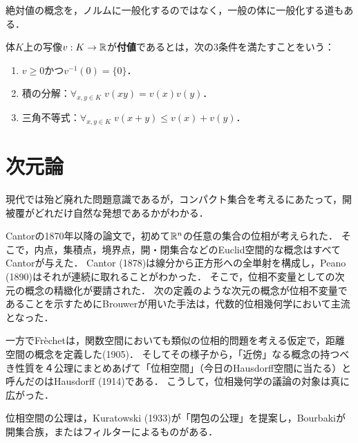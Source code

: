 \documentclass[uplatex,dvipdfmx]{jsreport}
\begin{document}
\begin{tcolorbox}[colframe=ForestGreen, colback=ForestGreen!10!white,breakable,colbacktitle=ForestGreen!40!white,coltitle=black,fonttitle=\bfseries\sffamily,
title=]
    絶対値の概念を，ノルムに一般化するのではなく，一般の体に一般化する道もある．
\end{tcolorbox}

\begin{definition}[valuation]
    体$K$上の写像$v:K\to\mathbb{R}$が\textbf{付値}であるとは，次の3条件を満たすことをいう：
    \begin{enumerate}
        \item $v\ge0$かつ$v^{-1}(0)=\{0\}$．
        \item 積の分解：$\forall_{x,y\in K}\;v(xy)=v(x)v(y)$．
        \item 三角不等式：$\forall_{x,y\in K}\;v(x+y)\le v(x)+v(y)$．
    \end{enumerate}
\end{definition}

\section{次元論}

\begin{tcolorbox}[colframe=ForestGreen, colback=ForestGreen!10!white,breakable,colbacktitle=ForestGreen!40!white,coltitle=black,fonttitle=\bfseries\sffamily,
title=]
    現代では殆ど廃れた問題意識であるが，コンパクト集合を考えるにあたって，開被覆がどれだけ自然な発想であるかがわかる．
\end{tcolorbox}

\begin{history}
    Cantorの1870年以降の論文で，初めて$\mathbb{R}^n$の任意の集合の位相が考えられた．
    そこで，内点，集積点，境界点，開・閉集合などのEuclid空間的な概念はすべてCantorが与えた．
    Cantor (1878)は線分から正方形への全単射を構成し，Peano (1890)はそれが連続に取れることがわかった．
    そこで，位相不変量としての次元の概念の精緻化が要請された．
    次の定義のような次元の概念が位相不変量であることを示すためにBrouwerが用いた手法は，代数的位相幾何学において主流となった．

    一方でFr\`{e}chetは，関数空間においても類似の位相的問題を考える仮定で，距離空間の概念を定義した(1905)．
    そしてその様子から，「近傍」なる概念の持つべき性質を４公理にまとめあげて「位相空間」（今日のHausdorff空間に当たる）と呼んだのはHausdorff (1914)である．
    こうして，位相幾何学の議論の対象は真に広がった．

    位相空間の公理は，Kuratowski (1933)が「閉包の公理」を提案し，Bourbakiが開集合族，またはフィルターによるものがある．
    
\end{history}
\end{document}
